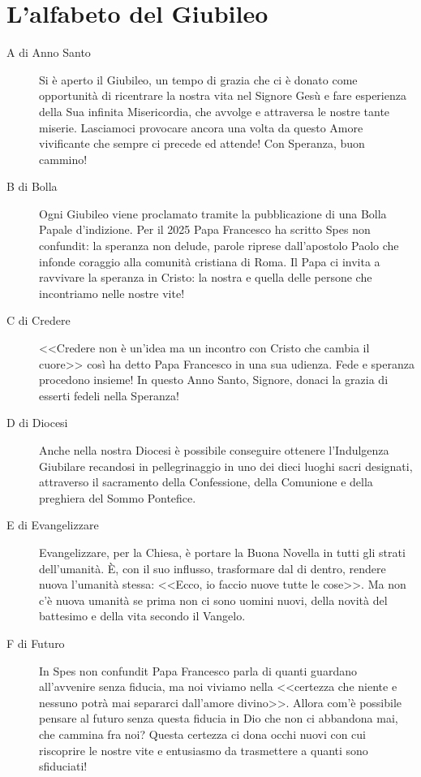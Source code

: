\section{L'alfabeto del Giubileo}

\begin{description}
  \item[A di Anno Santo] Si è aperto il Giubileo, un tempo di grazia che ci è donato come opportunità di ricentrare la nostra vita nel Signore Gesù e fare esperienza della Sua infinita Misericordia, che avvolge e attraversa le nostre tante miserie. Lasciamoci provocare ancora una volta da questo Amore vivificante che sempre ci precede ed attende! Con Speranza, buon cammino!

  \item[B di Bolla] Ogni Giubileo viene proclamato tramite la pubblicazione di una Bolla Papale d'indizione. Per il 2025 Papa Francesco ha scritto Spes non confundit: la speranza non delude, parole riprese dall'apostolo Paolo che infonde coraggio alla comunità cristiana di Roma. Il Papa ci invita a ravvivare la speranza in Cristo: la nostra e quella delle persone che incontriamo nelle nostre vite!

  \item[C di Credere] <<Credere non è un'idea ma un incontro con Cristo che cambia il cuore>> così ha detto Papa Francesco in una sua udienza. Fede e speranza procedono insieme! In questo Anno Santo, Signore, donaci la grazia di esserti fedeli nella Speranza!

  \item[D di Diocesi] Anche nella nostra Diocesi è possibile conseguire ottenere l'Indulgenza Giubilare recandosi in pellegrinaggio in uno dei dieci luoghi sacri designati, attraverso il sacramento della Confessione, della Comunione e della preghiera del Sommo Pontefice.

  \item[E di Evangelizzare] Evangelizzare, per la Chiesa, è portare la Buona Novella in tutti gli strati dell'umanità. È, con il suo influsso, trasformare dal di dentro, rendere nuova l'umanità stessa: <<Ecco, io faccio nuove tutte le cose>>. Ma non c'è nuova umanità se prima non ci sono uomini nuovi, della novità del battesimo e della vita secondo il Vangelo.

  \item[F di Futuro] In Spes non confundit Papa Francesco parla di quanti guardano all'avvenire senza fiducia, ma noi viviamo nella <<certezza che niente e nessuno potrà mai separarci dall'amore divino>>. Allora com'è possibile pensare al futuro senza questa fiducia in Dio che non ci abbandona mai, che cammina fra noi? Questa certezza ci dona occhi nuovi con cui riscoprire le nostre vite e entusiasmo da trasmettere a quanti sono sfiduciati!


\end{description}
